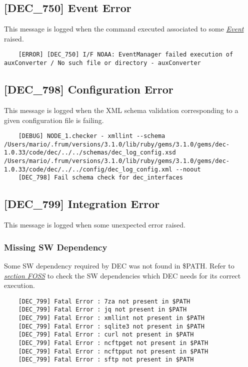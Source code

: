 \documentclass[dec_sum_main.tex]{subfiles}
\begin{document}
\label{DEC750}
\subsection{[DEC\_750] Event Error}
This message is logged when the command executed associated to some \hyperref[Events]{\textit{Event}} raised.
\begin{verbatim}
	[ERROR] [DEC_750] I/F NOAA: EventManager failed execution of auxConverter / No such file or directory - auxConverter
\end{verbatim}


\label{DEC798}
\subsection{[DEC\_798] Configuration Error}
This message is logged when the XML schema validation corresponding to a given configuration file is failing. 
\begin{verbatim}
	[DEBUG] NODE_1.checker - xmllint --schema /Users/mario/.frum/versions/3.1.0/lib/ruby/gems/3.1.0/gems/dec-1.0.33/code/dec/../../schemas/dec_log_config.xsd /Users/mario/.frum/versions/3.1.0/lib/ruby/gems/3.1.0/gems/dec-1.0.33/code/dec/../../config/dec_log_config.xml --noout
	[DEC_798] Fail schema check for dec_interfaces
\end{verbatim}


\label{DEC799}
\subsection{[DEC\_799] Integration Error}
This message is logged when some unexpected error raised. 

\subsubsection{Missing SW Dependency}
Some SW dependency required by DEC was not found in \$PATH. Refer to \hyperref[FOSS]{\textit{section FOSS}} to check the SW dependencies which DEC needs for its correct execution.
\begin{verbatim}
	[DEC_799] Fatal Error : 7za not present in $PATH
	[DEC_799] Fatal Error : jq not present in $PATH
	[DEC_799] Fatal Error : xmllint not present in $PATH
	[DEC_799] Fatal Error : sqlite3 not present in $PATH
	[DEC_799] Fatal Error : curl not present in $PATH
	[DEC_799] Fatal Error : ncftpget not present in $PATH
	[DEC_799] Fatal Error : ncftpput not present in $PATH
	[DEC_799] Fatal Error : sftp not present in $PATH
\end{verbatim}
\end{document}
